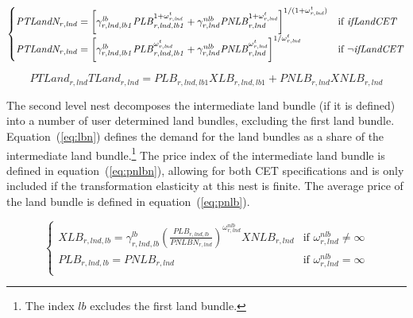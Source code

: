 \documentclass[11pt,letterpaper]{report}
\begin{document}
\begin{equation}
\label{eq:ptlandn}
\begin{cases}
\mathit{PTLandN_{r,\mathit{lnd}}} =
   \left[
      \gamma^{\mathit{lb}}_{r,\mathit{lnd},\mathit{lb1}}
      \mathit{PLB}_{r,\mathit{lnd},\mathit{lb1}}^{1+\omega^t_{r,\mathit{lnd}}}
   +  \gamma^{\mathit{nlb}}_{r,\mathit{lnd}}
      \mathit{PNLB}_{r,\mathit{lnd}}^{1+\omega^t_{r,\mathit{lnd}}}
   \right]^{{1}/{(1+\omega^t_{r,\mathit{lnd}})}}
& \textnormal{if } \mathit{ifLandCET} \\
\mathit{PTLandN_{r,\mathit{lnd}}} =
   \left[
      \gamma^{\mathit{lb}}_{r,\mathit{lnd},\mathit{lb1}}
      \mathit{PLB}_{r,\mathit{lnd},\mathit{lb1}}^{\omega^t_{r,\mathit{lnd}}}
   +  \gamma^{\mathit{nlb}}_{r,\mathit{lnd}}
      \mathit{PNLB}_{r,\mathit{lnd}}^{\omega^t_{r,\mathit{lnd}}}
   \right]^{{1}/{\omega^t_{r,\mathit{lnd}}}}
& \textnormal{if } \neg \mathit{ifLandCET} \\
\end{cases}
\end{equation}

\begin{equation}
\label{eq:ptland}
\mathit{PTLand_{r,\mathit{lnd}}} \mathit{TLand_{r,\mathit{lnd}}} =
   \mathit{PLB}_{r,\mathit{lnd},\mathit{lb1}} \mathit{XLB}_{r,\mathit{lnd},\mathit{lb1}}
+  \mathit{PNLB}_{r,\mathit{lnd}}\mathit{XNLB}_{r,\mathit{lnd}}
\end{equation}

The second level nest decomposes the intermediate land bundle (if it is defined)
into a number of user determined land bundles, excluding the first land bundle.
Equation~(\ref{eq:lbn}) defines the demand for the land bundles as a share of
the intermediate land bundle.\footnote{The index $\mathit{lb}$ excludes the
first land bundle.} The price index of the intermediate land bundle is defined
in equation~(\ref{eq:pnlbn}), allowing for both CET specifications and is only
included if the transformation elasticity at this nest is finite. The average
price of the land bundle is defined in equation~(\ref{eq:pnlb}).

\begin{equation}
\label{eq:lbn}
\begin{cases}
   \displaystyle \mathit{XLB}_{r,\mathit{lnd},\mathit{lb}} =
      \gamma^{\mathit{lb}}_{r,\mathit{lnd},\mathit{lb}}
      \left( \frac{\mathit{PLB}_{r,\mathit{lnd},\mathit{lb}}} {\mathit{PNLBN_{r,\mathit{lnd}}}}
      \right)^{\omega^{\mathit{nlb}}_{r,\mathit{lnd}}}
      \mathit{XNLB_{r,\mathit{lnd}}}
   & \textrm{if } \omega^{\mathit{nlb}}_{r,\mathit{lnd}} \ne \infty \\
   \displaystyle \mathit{PLB}_{r,\mathit{lnd},\mathit{lb}} = \mathit{PNLB_{r,\mathit{lnd}}}
   & \textrm{if }  \omega^{\mathit{nlb}}_{r,\mathit{lnd}} = \infty \\
\end{cases}
\end{equation}
\end{document}
